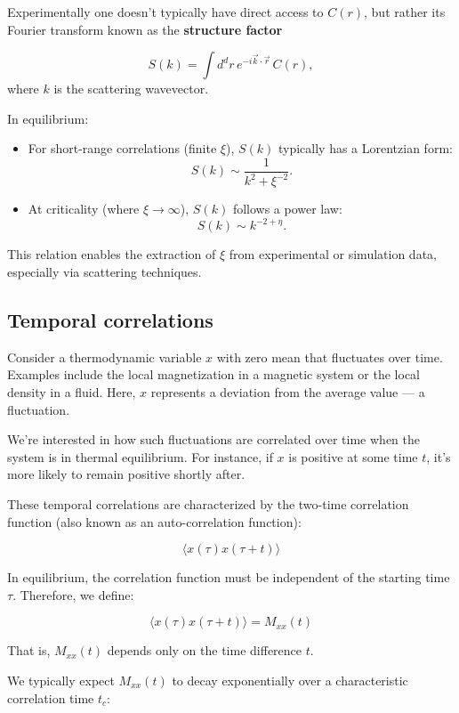 \documentclass[
  letterpaper,
  DIV=11,
  numbers=noendperiod]{scrreprt}
\begin{document}
Experimentally one doesn't typically have direct access to \(C(r)\), but
rather its Fourier transform known as the \textbf{structure factor}

\[
S(k) = \int d^d r \, e^{-i \vec{k} \cdot \vec{r}} \, C(r),
\] where \(k\) is the scattering wavevector.

In equilibrium:

\begin{itemize}
\item
  For short-range correlations (finite \(\xi\)), \(S(k)\) typically has
  a Lorentzian form: \[
  S(k) \sim \frac{1}{k^2 + \xi^{-2}}.
  \]
\item
  At criticality (where \(\xi \to \infty\)), \(S(k)\) follows a power
  law: \[
  S(k) \sim k^{-2 + \eta}.
  \]
\end{itemize}

This relation enables the extraction of \(\xi\) from experimental or
simulation data, especially via scattering techniques.

\subsection{Temporal correlations}\label{temporal-correlations}

Consider a thermodynamic variable \(x\) with zero mean that fluctuates
over time. Examples include the local magnetization in a magnetic system
or the local density in a fluid. Here, \(x\) represents a deviation from
the average value --- a fluctuation.

We're interested in how such fluctuations are correlated over time when
the system is in thermal equilibrium. For instance, if \(x\) is positive
at some time \(t\), it's more likely to remain positive shortly after.

These temporal correlations are characterized by the two-time
correlation function (also known as an auto-correlation function):

\[
\langle x(\tau) x(\tau + t) \rangle
\]

In equilibrium, the correlation function must be independent of the
starting time \(\tau\). Therefore, we define:

\[
\langle x(\tau) x(\tau + t) \rangle = M_{xx}(t)
\]

That is, \(M_{xx}(t)\) depends only on the time difference \(t\).

We typically expect \(M_{xx}(t)\) to decay exponentially over a
characteristic correlation time \(t_c\):
\end{document}
